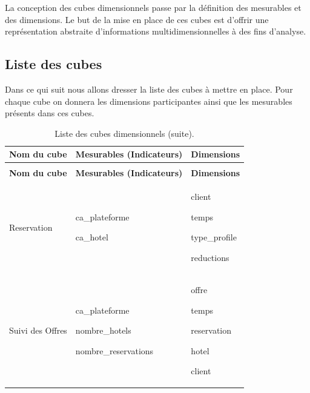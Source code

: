     La conception des cubes dimensionnels passe par la définition des mesurables et des dimensions. Le but de la mise en place de ces cubes est d’offrir une représentation abstraite d'informations multidimensionnelles à des fins d’analyse. 


\subsection{Liste des cubes}
Dans ce qui suit nous allons dresser la liste des cubes à mettre en place. Pour chaque
cube on donnera les dimensions participantes ainsi que les mesurables présents dans ces
cubes.



	\begin{longtable}{|p{}|p{}|p{}|}
		\caption{Liste des cubes dimensionnels.} 
		\label{Liste des cubes dimensionnels}
		\\
		
		
		\hline 
		\textbf{Nom du cube} & 
		\textbf{Mesurables (Indicateurs)} &
		\textbf{Dimensions}
		\\
		
		
		\endfirsthead
		\caption[]{Liste des cubes dimensionnels (suite).} 
		\\
		\hline 
		\textbf{Nom du cube} & 
		\textbf{Mesurables (Indicateurs)} &
		\textbf{Dimensions}
		\\
		\hline
		\endhead
		\hline
		\endfoot
		\hline
		
		
		\hline
		Reservation &  
		
		\begin{description}
		 \item ca\_plateforme
		 \item ca\_hotel
		 \end{description} &
		 
		 \begin{description}
		 \item client
		 \item temps
		 \item type\_profile
		 \item reductions
		 \end{description}
		\\ 
		
		\hline
		Suivi des Offres &  
		\begin{description}
		 \item ca\_plateforme
		 \item nombre\_hotels
		 \item nombre\_reservations
		 \end{description} &
		\begin{description}
		 \item offre
		 \item temps
		 \item reservation
		 \item hotel
		 \item client
		 \end{description}
		\\
		

\end{longtable}
